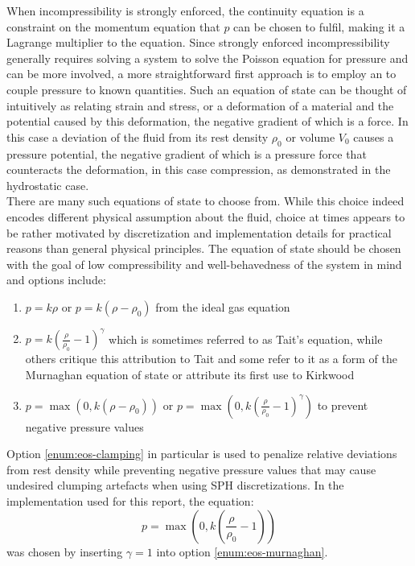 When incompressibility is strongly enforced, the continuity equation is a constraint on the momentum equation that $p$ can be chosen to fulfil, making it a Lagrange multiplier to the equation\autocite*{tutorial}. Since strongly enforced incompressibility generally requires solving a system to solve the Poisson equation for pressure and can be more involved, a more straightforward first approach is to employ an  to couple pressure to known quantities. Such an equation of state can be thought of intuitively as relating strain and stress, or a deformation of a material and the potential caused by this deformation, the negative gradient of which is a force. In this case a deviation of the fluid from its rest density $\rho_0$ or volume $V_0$ causes a pressure potential, the negative gradient of which is a pressure force that counteracts the deformation, in this case compression, as demonstrated in the hydrostatic case.\\


There are many such equations of state to choose from. While this choice indeed encodes different physical assumption about the fluid, choice at times appears to be rather motivated by discretization and implementation details for practical reasons than general physical principles. The equation of state should be chosen with the goal of low compressibility and well-behavedness of the system in mind and options include:


\begin{enumerate}
    \item $p = k\rho$ or $p=k(\rho-\rho_0)$ from the ideal gas equation \autocite*{wcsph}
    \item\label{enum:eos-murnaghan} $p=k\left(\frac{\rho}{\rho_0}-1\right)^\gamma$ which is sometimes referred to as Tait's equation\autocite*{wcsph}, while others critique this attribution to Tait\autocite*{moanghan-2012-sph-and-its-diverse-applications} and some refer to it as a form of the Murnaghan equation of state\autocite*{macdonald-state-equations-murnaghan} or attribute its first use to Kirkwood\autocite*{macdonald-state-equations-murnaghan}
    \item\label{enum:eos-clamping} $p=\max\left(0, k(\rho-\rho_0)\right)$ or $p=\max\left(0, k\left(\frac{\rho}{\rho_0}-1\right)^\gamma\right)$ to prevent negative pressure values\autocite*{tutorial}
\end{enumerate}

Option \ref{enum:eos-clamping} in particular is used to penalize relative deviations from rest density while preventing negative pressure values that may cause undesired clumping artefacts when using SPH discretizations. In the implementation used for this report, the equation:
\begin{equation}\label{eq:state-equation}
    p=\max\left(0, k\left(\frac{\rho}{\rho_0}-1\right)\right)
\end{equation}
was chosen by inserting $\gamma=1$ into option \ref{enum:eos-murnaghan}.



